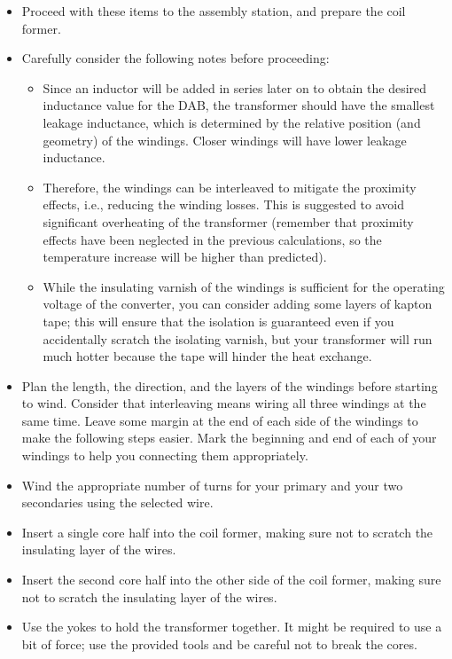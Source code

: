 \documentclass{PELsmallreport}
\begin{document}
\begin{itemize}
    \item Proceed with these items to the assembly station, and prepare the coil former. 
    \item Carefully consider the following notes before proceeding:
    \begin{itemize}
        \item Since an inductor will be added in series later on to obtain the desired inductance value for the DAB, the transformer should have the smallest leakage inductance, which is determined by the relative position (and geometry) of the windings. Closer windings will have lower leakage inductance.
        \item Therefore, the windings can be interleaved to mitigate the proximity effects, i.e., reducing the winding losses. This is suggested to avoid significant overheating of the transformer (remember that proximity effects have been neglected in the previous calculations, so the temperature increase will be higher than predicted).
        \item While the insulating varnish of the windings is sufficient for the operating voltage of the converter, you can consider adding some layers of kapton tape; this will ensure that the isolation is guaranteed even if you accidentally scratch the isolating varnish, but your transformer will run much hotter because the tape will hinder the heat exchange.
    \end{itemize}
    
     
    \item Plan the length, the direction, and the layers of the windings before starting to wind. Consider that interleaving means wiring all three windings at the same time.
    Leave some margin at the end of each side of the windings to make the following steps easier. 
    Mark the beginning and end of each of your windings to help you connecting them appropriately.
    \item Wind the appropriate number of turns for your primary and your two secondaries using the selected wire. 
    \item Insert a single core half into the coil former, making sure not to scratch the insulating layer of the wires.
    \item Insert the second core half into the other side of the coil former, making sure not to scratch the insulating layer of the wires. 
    \item Use the yokes to hold the transformer together. It might be required to use a bit of force; use the provided tools and be careful not to break the cores. 
\end{itemize}
\end{document}
